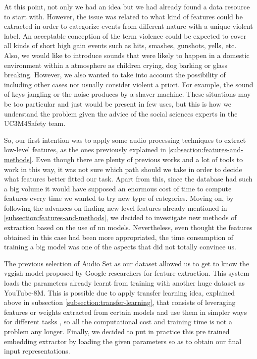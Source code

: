 	At this point, not only we had an idea but we had already found a data resource to start with. However, the issue was related to what kind of features could be extracted in order to categorize events from different nature with a unique violent label. An acceptable conception of the term violence could be expected to cover all kinds of short high gain  events such as hits, smashes, gunshots, yells, etc. Also, we would like to introduce sounds that were likely to happen in a domestic environment within a  atmosphere as children crying, dog barking or glass breaking. However, we also wanted to take into account the possibility of including other cases not usually consider violent a priori. For example, the sound of keys jangling or the noise produces by a shaver machine. These situations may be too particular and just would be present in few uses, but this is how we understand the problem given the advice of the social sciences experts in the UC3M4Safety team.
	
	So, our first intention was to apply some audio processing techniques to extract low-level features, as the ones previously explained in \ref{subsection:features-and-methods}. Even though there are plenty of previous works and a lot of tools to work in this way, it was not sure which path should we take in order to decide what features better fitted our task. Apart from this, since the database had such a big volume it would have supposed an enormous cost of time to compute features every time we wanted to try new type of categories. Moving on, by following the advances on finding new level features already mentioned in \ref{subsection:features-and-methods}, we decided to investigate new methods of extraction based on the use of \acrlong{nn} models. Nevertheless, even thought the features obtained in this case had been more appropriated, the time consumption of training a big model was one of the aspects that did not totally convince us.
	
	The previous selection of Audio Set as our dataset allowed us to get to know the \acrshort{vgg}ish model proposed by Google researchers for feature extraction. This system loads the parameters already learnt from training with another huge dataset as YouTube-8M. This is possible due to apply transfer learning idea, explained above in subsection \ref{subsection:transfer-learning}, that consists of leveraging features or weights extracted from certain models and use them in simpler ways for different tasks \cite{Sarkar2018}, so all the computational cost and training time is not a problem any longer. Finally, we decided to put in practice this pre trained embedding extractor by loading the given parameters so as to obtain our final input representations.
	
